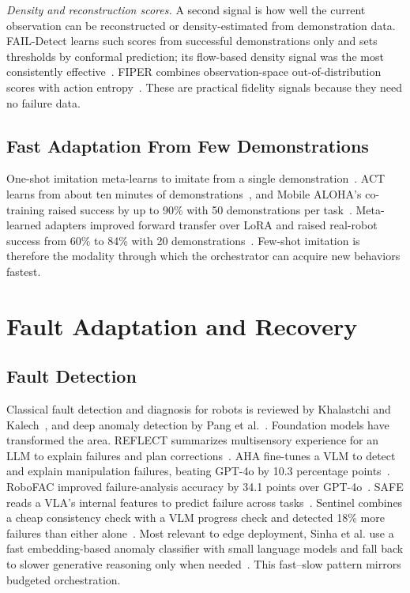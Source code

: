 \documentclass[journal]{IEEEtran}
\begin{document}
\textit{Density and reconstruction scores.} A second signal is how well the current observation can be reconstructed or density-estimated from demonstration data. FAIL-Detect learns such scores from successful demonstrations only and sets thresholds by conformal prediction; its flow-based density signal was the most consistently effective~\cite{Xu2025}. FIPER combines observation-space out-of-distribution scores with action entropy~\cite{Romer2025}. These are practical fidelity signals because they need no failure data.


\subsection{Fast Adaptation From Few Demonstrations}\label{sec:fewshot}
One-shot imitation meta-learns to imitate from a single demonstration~\cite{Duan2017}. ACT learns from about ten minutes of demonstrations~\cite{Zhao2023}, and Mobile ALOHA's co-training raised success by up to 90\% with 50 demonstrations per task~\cite{Fu2024}. Meta-learned adapters improved forward transfer over LoRA and raised real-robot success from 60\% to 84\% with 20 demonstrations~\cite{Zhu2025}. Few-shot imitation is therefore the modality through which the orchestrator can acquire new behaviors fastest.


\section{Fault Adaptation and Recovery}\label{sec:fault}

\subsection{Fault Detection}\label{sec:faultdet}
Classical fault detection and diagnosis for robots is reviewed by Khalastchi and Kalech~\cite{Khalastchi2018}, and deep anomaly detection by Pang et al.~\cite{Pang2021}. Foundation models have transformed the area. REFLECT summarizes multisensory experience for an LLM to explain failures and plan corrections~\cite{Liu2023c}. AHA fine-tunes a VLM to detect and explain manipulation failures, beating GPT-4o by 10.3 percentage points~\cite{Duan2025}. RoboFAC improved failure-analysis accuracy by 34.1 points over GPT-4o~\cite{Ye2025}. SAFE reads a VLA's internal features to predict failure across tasks~\cite{Gu2025}. Sentinel combines a cheap consistency check with a VLM progress check and detected 18\% more failures than either alone~\cite{Agia2024}. Most relevant to edge deployment, Sinha et al. use a fast embedding-based anomaly classifier with small language models and fall back to slower generative reasoning only when needed~\cite{Sinha2024}. This fast--slow pattern mirrors budgeted orchestration.
\end{document}
